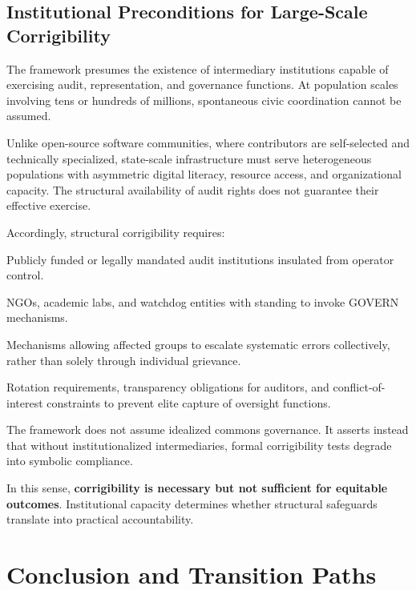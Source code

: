 \documentclass{article}
\begin{document}
\subsection{Institutional Preconditions for Large-Scale Corrigibility}
\label{subsec:institutional}

The framework presumes the existence of intermediary institutions capable of exercising audit, representation, and governance functions. At population scales involving tens or hundreds of millions, spontaneous civic coordination cannot be assumed.

Unlike open-source software communities, where contributors are self-selected and technically specialized, state-scale infrastructure must serve heterogeneous populations with asymmetric digital literacy, resource access, and organizational capacity. The structural availability of audit rights does not guarantee their effective exercise.

Accordingly, structural corrigibility requires:

\begin{description}[noitemsep]
    \item[Independent Verification Bodies] Publicly funded or legally mandated audit institutions insulated from operator control.
    \item[Civic Technical Intermediaries] NGOs, academic labs, and watchdog entities with standing to invoke GOVERN mechanisms.
    \item[Distributed Representation Channels] Mechanisms allowing affected groups to escalate systematic errors collectively, rather than solely through individual grievance.
    \item[Anti-Capture Safeguards] Rotation requirements, transparency obligations for auditors, and conflict-of-interest constraints to prevent elite capture of oversight functions.
\end{description}

The framework does not assume idealized commons governance. It asserts instead that without institutionalized intermediaries, formal corrigibility tests degrade into symbolic compliance.

In this sense, \textbf{corrigibility is necessary but not sufficient for equitable outcomes}. Institutional capacity determines whether structural safeguards translate into practical accountability.

\section{Conclusion and Transition Paths}
\end{document}
